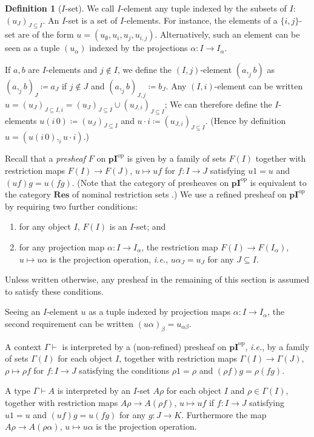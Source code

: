 \documentclass[english]{PaperTools/latex/entcs}
\theoremstyle{plain}
\theoremstyle{definition}
\newtheorem{definition}[theorem]{Definition}
\theoremstyle{remark}
\def\pI{\ensuremath{\mathbf{pI}}}
\def\ie{\textit{i.e.}}
\def\opp{\mathrm{op}}
\begin{document}
\begin{definition}[$I$-set]
  We call $I$-element any tuple indexed by the subsets of $I$: $(u_J)_{J ⊆ I}$.
  An $I$-set is a set of $I$-elements.  For instance, the elements of a
  $\{i,j\}$-set are of the form $u = (u_∅,u_i,u_j,u_{i,j})$.
  Alternatively, such an element can be seen as a tuple $(u_α)$ indexed
  by the projections $α : I → I_α$.
\end{definition}
  If $a,b$ are $I$-elements and $j ∉ I$, we define the $(I,j)$-element
  $(a ,_j b)$ as $(a ,_j b)_J ≔ a_J$ if $j ∉ J$ and $(a ,_j b)_{J,j} ≔ b_J$.
  Any $(I,i)$-element can be written $u = (u_J)_{J ⊆ I,i} = (u_J)_{J ⊆ I} ∪ (u_{J,i})_{J ⊆ I}$;
  We can therefore define the $I$-elements $u (i\,0) ≔ (u_J)_{J ⊆ I}$ and
  $u · i ≔ (u_{J,i})_{J ⊆ I}$.
  (Hence by definition $u = (u (i\,0) ,_i u · i)$.)

Recall that a \emph{presheaf} $F$ on $\pI^\opp$ is given by a family of
sets $F(I)$ together with restriction maps $F(I) → F(J)$, $u ↦ uf$ for
$f : I → J$ satisfying $u1 = u$ and $(uf)g = u(fg)$.
(Note that the category of presheaves on $\pI^\opp$ is equivalent to the
category $\mathbf{Res}$ of nominal restriction sets
\cite[rem.~9.9 p.~161]{PittsAM:nomsns}.)
%
We use a refined presheaf on $\pI^\opp$ by requiring two further conditions:
%
\begin{enumerate}
  \item for any object $I$, $F(I)$ is an $I$-set; and
    \label{itm:presheaf-refinement-1}
  \item for any projection map $α : I → I_α$, the restriction
    map $F(I) → F(I_α)$, $u ↦ uα$ is the projection operation, \ie,
    $uα_J = u_J$ for any $J ⊆ I$.
    \label{itm:presheaf-refinement-2}
\end{enumerate}
Unless written otherwise, any presheaf in the remaining of this section
is assumed to satisfy these conditions.

Seeing an $I$-element $u$ as a tuple indexed by projection maps
$α : I → I_α$, the second requirement can be written $(uα)_β = u_{αβ}$.

\smallskip
A context $Γ ⊢$ is interpreted by a (non-refined) presheaf on $\pI^\opp$, \ie,
by a family of sets $Γ(I)$ for each object $I$, together with
restriction maps $Γ(I) → Γ(J)$, $ρ ↦ ρf$ for $f : I → J$ satisfying the
conditions $ρ1 = ρ$ and $(ρf)g = ρ(fg)$.

A type $Γ ⊢ A$ is interpreted by an $I$-set $Aρ$ for each object $I$ and
$ρ ∈ Γ(I)$,
together with restriction maps $Aρ → A(ρf)$, $u ↦ uf$ if $f : I → J$
satisfying $u1 = u$ and $(uf)g = u(fg)$ for any $g : J → K$.
Furthermore the map $Aρ → A(ρα)$, $u ↦ uα$ is the projection operation.
\end{document}
